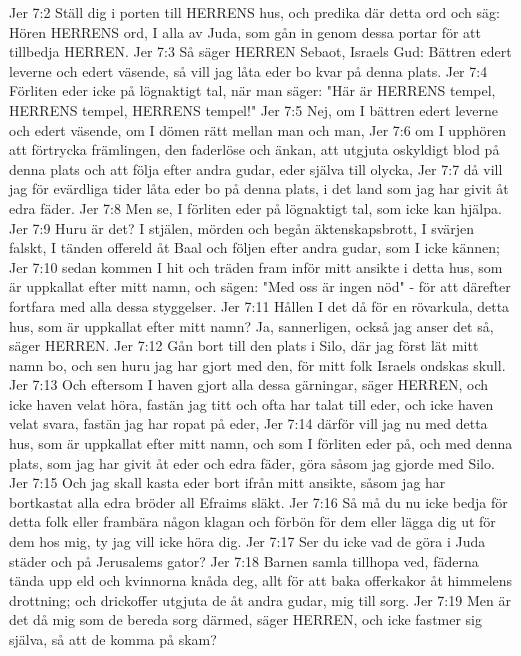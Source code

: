 Jer 7:2  Ställ dig i porten till HERRENS hus, och predika där detta ord och säg: Hören HERRENS ord, I alla av Juda, som gån in genom dessa portar för att tillbedja HERREN.
Jer 7:3  Så säger HERREN Sebaot, Israels Gud: Bättren edert leverne och edert väsende, så vill jag låta eder bo kvar på denna plats.
Jer 7:4  Förliten eder icke på lögnaktigt tal, när man säger: "Här är HERRENS tempel, HERRENS tempel, HERRENS tempel!"
Jer 7:5  Nej, om I bättren edert leverne och edert väsende, om I dömen rätt mellan man och man,
Jer 7:6  om I upphören att förtrycka främlingen, den faderlöse och änkan, att utgjuta oskyldigt blod på denna plats och att följa efter andra gudar, eder själva till olycka,
Jer 7:7  då vill jag för evärdliga tider låta eder bo på denna plats, i det land som jag har givit åt edra fäder.
Jer 7:8  Men se, I förliten eder på lögnaktigt tal, som icke kan hjälpa.
Jer 7:9  Huru är det? I stjälen, mörden och begån äktenskapsbrott, I svärjen falskt, I tänden offereld åt Baal och följen efter andra gudar, som I icke kännen;
Jer 7:10  sedan kommen I hit och träden fram inför mitt ansikte i detta hus, som är uppkallat efter mitt namn, och sägen: "Med oss är ingen nöd" - för att därefter fortfara med alla dessa styggelser.
Jer 7:11  Hållen I det då för en rövarkula, detta hus, som är uppkallat efter mitt namn? Ja, sannerligen, också jag anser det så, säger HERREN.
Jer 7:12  Gån bort till den plats i Silo, där jag först lät mitt namn bo, och sen huru jag har gjort med den, för mitt folk Israels ondskas skull.
Jer 7:13  Och eftersom I haven gjort alla dessa gärningar, säger HERREN, och icke haven velat höra, fastän jag titt och ofta har talat till eder, och icke haven velat svara, fastän jag har ropat på eder,
Jer 7:14  därför vill jag nu med detta hus, som är uppkallat efter mitt namn, och som I förliten eder på, och med denna plats, som jag har givit åt eder och edra fäder, göra såsom jag gjorde med Silo.
Jer 7:15  Och jag skall kasta eder bort ifrån mitt ansikte, såsom jag har bortkastat alla edra bröder all Efraims släkt.
Jer 7:16  Så må du nu icke bedja för detta folk eller frambära någon klagan och förbön för dem eller lägga dig ut för dem hos mig, ty jag vill icke höra dig.
Jer 7:17  Ser du icke vad de göra i Juda städer och på Jerusalems gator?
Jer 7:18  Barnen samla tillhopa ved, fäderna tända upp eld och kvinnorna knåda deg, allt för att baka offerkakor åt himmelens drottning; och drickoffer utgjuta de åt andra gudar, mig till sorg.
Jer 7:19  Men är det då mig som de bereda sorg därmed, säger HERREN, och icke fastmer sig själva, så att de komma på skam?
